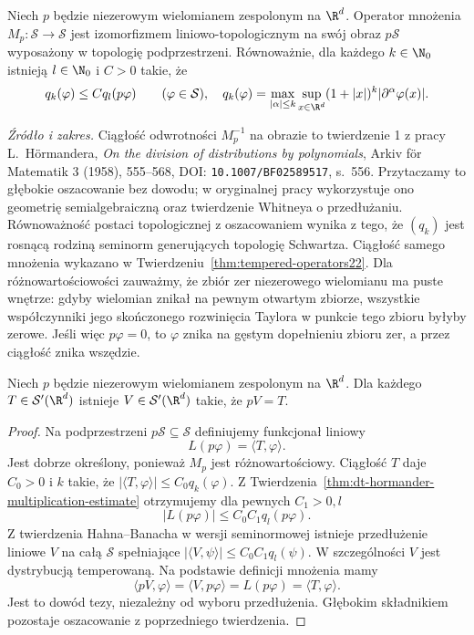 \begin{twierdzenie}
\label{thm:dt-hormander-multiplication-estimate}
Niech $p$ będzie niezerowym wielomianem zespolonym
na $\R^d$. Operator mnożenia $M_p:\mathcal S\to\mathcal S$
jest izomorfizmem liniowo-topologicznym na swój obraz
$p\mathcal S$ wyposażony w topologię podprzestrzeni.
Równoważnie, dla każdego $k\in\N_0$ istnieją
$l\in\N_0$ i $C>0$ takie, że
\[
 q_k(\varphi)\le C q_l(p\varphi)
 \qquad(\varphi\in\mathcal S),
 \quad
 q_k(\varphi)=\max_{|\alpha|\le k}
 \sup_{x\in\R^d}(1+|x|)^k|\partial^\alpha\varphi(x)|.
\]
\end{twierdzenie}
\noindent\emph{Źródło i zakres.}
Ciągłość odwrotności $M_p^{-1}$ na obrazie to
twierdzenie 1 z pracy L.~Hörmandera,
\emph{On the division of distributions by polynomials},
Arkiv för Matematik 3 (1958), 555--568,
DOI: \texttt{10.1007/BF02589517}, s.~556.
Przytaczamy to głębokie oszacowanie bez dowodu;
w oryginalnej pracy wykorzystuje ono geometrię
semialgebraiczną oraz twierdzenie Whitneya o przedłużaniu.
Równoważność postaci topologicznej z oszacowaniem
wynika z tego, że $(q_k)$ jest rosnącą rodziną
seminorm generujących topologię Schwartza.
Ciągłość samego mnożenia wykazano w
Twierdzeniu~\ref{thm:tempered-operators22}.
Dla różnowartościowości zauważmy, że zbiór zer
niezerowego wielomianu ma puste wnętrze:
gdyby wielomian znikał na pewnym otwartym zbiorze,
wszystkie współczynniki jego skończonego rozwinięcia
Taylora w punkcie tego zbioru byłyby zerowe.
Jeśli więc $p\varphi=0$, to $\varphi$ znika na gęstym
dopełnieniu zbioru zer, a przez ciągłość znika wszędzie.

\begin{twierdzenie}
\label{thm:dt-polynomial-division}
Niech $p$ będzie niezerowym wielomianem zespolonym
na $\R^d$. Dla każdego $T\in\mathcal S'(\R^d)$
istnieje $V\in\mathcal S'(\R^d)$ takie, że $pV=T$.
\end{twierdzenie}
\begin{proof}
Na podprzestrzeni $p\mathcal S\subseteq\mathcal S$
definiujemy funkcjonał liniowy
\[
 L(p\varphi)=\langle T,\varphi\rangle.
\]
Jest dobrze określony, ponieważ $M_p$ jest
różnowartościowy. Ciągłość $T$ daje $C_0>0$ i $k$
takie, że $|\langle T,\varphi\rangle|\le C_0q_k(\varphi)$.
Z Twierdzenia~\ref{thm:dt-hormander-multiplication-estimate}
otrzymujemy dla pewnych $C_1>0,l$
\[
 |L(p\varphi)|\le C_0C_1q_l(p\varphi).
\]
Z twierdzenia Hahna--Banacha w wersji seminormowej
istnieje przedłużenie liniowe $V$ na całą $\mathcal S$
spełniające $|\langle V,\psi\rangle|\le C_0C_1q_l(\psi)$.
W szczególności $V$ jest dystrybucją temperowaną.
Na podstawie definicji mnożenia mamy
\[
 \langle pV,\varphi\rangle
 =\langle V,p\varphi\rangle
 =L(p\varphi)=\langle T,\varphi\rangle.
\]
Jest to dowód tezy, niezależny od wyboru
przedłużenia. Głębokim składnikiem pozostaje
oszacowanie z poprzedniego twierdzenia.
\end{proof}

